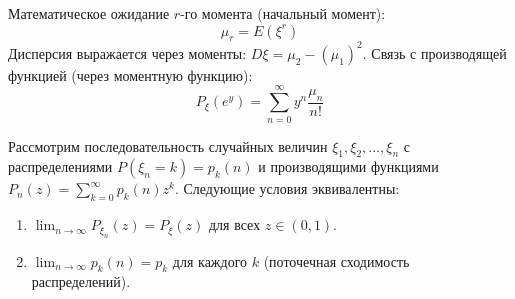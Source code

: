 \begin{definition}
Математическое ожидание $r$-го момента (начальный момент):
$$ \mu_r = E(\xi^r) $$
Дисперсия выражается через моменты: $D\xi = \mu_2 - (\mu_1)^2$.
Связь с производящей функцией (через моментную функцию):
$$ P_\xi(e^y) = \sum_{n=0}^{\infty} y^n \frac{\mu_n}{n!} $$
\end{definition}

\begin{theorem}
Рассмотрим последовательность случайных величин $\xi_1, \xi_2, \dots, \xi_n$ с распределениями $P(\xi_n = k) = p_k(n)$ и производящими функциями $P_n(z) = \sum_{k=0}^{\infty} p_k(n) z^k$.
Следующие условия эквивалентны:
\begin{enumerate}
    \item $\lim_{n \to \infty} P_{\xi_n}(z) = P_\xi(z)$ для всех $z \in (0, 1)$.
    \item $\lim_{n \to \infty} p_k(n) = p_k$ для каждого $k$ (поточечная сходимость распределений).
\end{enumerate}
\end{theorem}